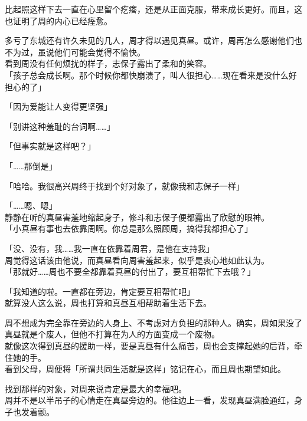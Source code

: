 比起照这样下去一直在心里留个疙瘩，还是从正面克服，带来成长更好。而且，这也证明了周的内心已经痊愈。

多亏了东城还有许久未见的几人，周才得以遇见真昼。或许，周再怎么感谢他们也不为过，虽说他们可能会觉得不愉快。\\

看到周没有任何烦扰的样子，志保子露出了柔和的笑容。\\

「孩子总会成长啊。那个时候你都快崩溃了，叫人很担心……现在看来是没什么好担心的了」

「因为爱能让人变得更坚强」

「别讲这种羞耻的台词啊……」

「但事实就是这样吧？」

「……那倒是」

「哈哈。我很高兴周终于找到个好对象了，就像我和志保子一样」

「……嗯、嗯」\\

静静在听的真昼害羞地缩起身子，修斗和志保子便都露出了欣慰的眼神。\\

「小真昼有事也去依靠周啊。你总是那么照顾周，搞得我都担心了」

「没、没有，我……我一直在依靠着周君，是他在支持我」\\

周觉得这话该由他说，而真昼看向周害羞起来，似乎是衷心地如此认为。\\

「那就好……周也不要全都靠着真昼的付出了，要互相帮忙下去哦？」

「我知道的啦。一直都在旁边，肯定要互相帮忙吧」\\

就算没人这么说，周也打算和真昼互相帮助着生活下去。

周不想成为完全靠在旁边的人身上、不考虑对方负担的那种人。确实，周如果没了真昼就是个废人，但他不打算在为人的方面变成一个废物。\\

就像这次得到真昼的援助一样，要是真昼有什么痛苦，周也会支撑起她的后背，牵住她的手。\\

看到父母，周便将「所谓共同生活就是这样」铭记在心，而且周也期望如此。

找到那样的对象，对周来说肯定是最大的幸福吧。\\

周并不是以半吊子的心情走在真昼旁边的。他往边上一看，发现真昼满脸通红，身子也发着颤。

